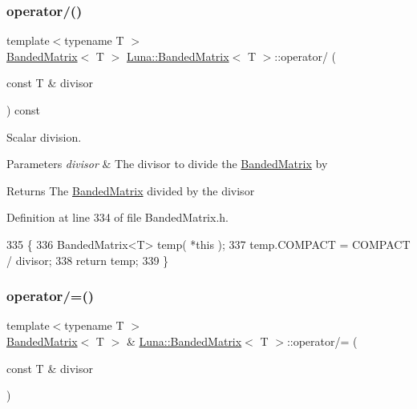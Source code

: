 \subsubsection{\texorpdfstring{operator/()}{operator/()}}
{\footnotesize\ttfamily template$<$typename T $>$ \\
\hyperlink{classLuna_1_1BandedMatrix}{Banded\+Matrix}$<$ T $>$ \hyperlink{classLuna_1_1BandedMatrix}{Luna\+::\+Banded\+Matrix}$<$ T $>$\+::operator/ (\begin{DoxyParamCaption}\item[{const T \&}]{divisor }\end{DoxyParamCaption}) const\hspace{0.3cm}{\ttfamily [inline]}}



Scalar division. 


\begin{DoxyParams}{Parameters}
{\em divisor} & The divisor to divide the \hyperlink{classLuna_1_1BandedMatrix}{Banded\+Matrix} by \\
\hline
\end{DoxyParams}
\begin{DoxyReturn}{Returns}
The \hyperlink{classLuna_1_1BandedMatrix}{Banded\+Matrix} divided by the divisor 
\end{DoxyReturn}


Definition at line 334 of file Banded\+Matrix.\+h.


\begin{DoxyCode}
335   \{
336     BandedMatrix<T> temp( *\textcolor{keyword}{this} );
337     temp.COMPACT = COMPACT / divisor;
338     \textcolor{keywordflow}{return} temp;
339   \}
\end{DoxyCode}
\mbox{\label{classLuna_1_1BandedMatrix_ace564482ba04dbf55a0237c4d1092dce}} 
\subsubsection{\texorpdfstring{operator/=()}{operator/=()}}
{\footnotesize\ttfamily template$<$typename T $>$ \\
\hyperlink{classLuna_1_1BandedMatrix}{Banded\+Matrix}$<$ T $>$ \& \hyperlink{classLuna_1_1BandedMatrix}{Luna\+::\+Banded\+Matrix}$<$ T $>$\+::operator/= (\begin{DoxyParamCaption}\item[{const T \&}]{divisor }\end{DoxyParamCaption})\hspace{0.3cm}{\ttfamily [inline]}}



